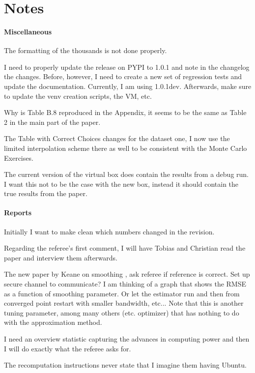 \section{Notes}


\paragraph{Miscellaneous}

\begin{boenumerate}
\item The formatting of the thousands is not done properly.
\item I need to properly update the release on PYPI to 1.0.1 and note in the changelog the changes. Before, however, I need to create a new set of regression tests and update the documentation. Currently, I am using 1.0.1dev. Afterwards, make sure to update the venv creation scripts, the VM, etc.
\item Why is Table B.8 reproduced in the Appendix, it seems to be the same as Table 2 in the main part of the paper.
\item The Table with Correct Choices changes for the dataset one, I now use the limited interpolation scheme there as well to be consistent with the Monte Carlo Exercises.
\item The current version of the virtual box does contain the results from a debug run. I want this not to be the case with the new box, instead it should contain the true results from the paper.
\end{boenumerate}

\paragraph{Reports}

\begin{boenumerate}
\item Initially I want to make clean which numbers changed in the revision.
\item Regarding the referee's first comment, I will have Tobias and Christian read the paper and interview them afterwards.
\item The new paper by Keane on smoothing \citep{Bruins.2015}, ask referee if reference is correct. Set up secure channel to communicate? I am thinking of a graph that shows the RMSE as a function of smoothing parameter. Or let the estimator run and then from converged point restart with smaller bandwidth, etc... Note that this is another tuning parameter, among many others (etc. optimizer) that has nothing to do with the approximation method.
\item I need an overview statistic capturing the advances in computing power and then I will do exactly what the referee asks for.
\item The recomputation instructions never state that I imagine them having Ubuntu.
\end{boenumerate}
